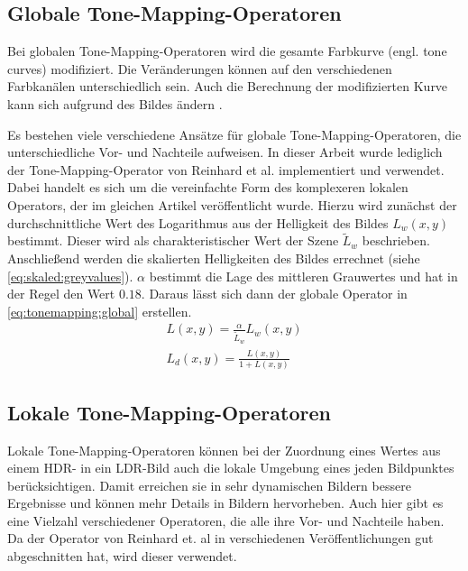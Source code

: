  \subsection{Globale \gls{Tone-Mapping}-Operatoren}
\label{sub:tone:global}
Bei globalen \gls{Tone-Mapping}-Operatoren wird die gesamte Farbkurve (engl. tone curves) modifiziert. Die Veränderungen können auf den verschiedenen Farbkanälen unterschiedlich sein. Auch die Berechnung der modifizierten Kurve kann sich aufgrund des Bildes ändern \cite[S. 146]{Bloch2012}. 

Es bestehen viele verschiedene Ansätze für globale \gls{Tone-Mapping}-Operatoren, die unterschiedliche Vor- und Nachteile aufweisen.
In dieser Arbeit wurde lediglich der \gls{Tone-Mapping}-Operator von Reinhard et al. \cite{ReinhardToneMapper} implementiert und verwendet. Dabei handelt es sich um die vereinfachte Form des komplexeren lokalen Operators, der im gleichen Artikel veröffentlicht wurde.
Hierzu wird zunächst der durchschnittliche Wert des Logarithmus aus der Helligkeit des Bildes $L_w(x,y)$ bestimmt. Dieser wird als charakteristischer Wert der Szene $\tilde{L}_w$ beschrieben. Anschließend werden die skalierten Helligkeiten des Bildes errechnet (siehe \autoref{eq:skaled:greyvalues}). $\alpha$ bestimmt die Lage des mittleren Grauwertes und hat in der Regel den Wert $0.18$. Daraus lässt sich dann der globale Operator in \autoref{eq:tonemapping:global} erstellen.
\begin{align}
\label{eq:skaled:greyvalues}
L(x,y) = \frac{\alpha}{\tilde{L}_w} L_w(x,y)\\
\label{eq:tonemapping:global}
L_d(x, y) =\frac{L(x,y)}{1+ L(x,y)}
\end{align}


\subsection{Lokale \gls{Tone-Mapping}-Operatoren}
\label{sub:tone:local}

Lokale \gls{Tone-Mapping}-Operatoren können bei der Zuordnung eines Wertes aus einem \gls{HDR}- in ein \gls{LDR}-Bild auch die lokale Umgebung eines jeden Bildpunktes berücksichtigen. Damit erreichen sie in sehr dynamischen Bildern bessere Ergebnisse und können mehr Details in Bildern hervorheben. Auch hier gibt es eine Vielzahl verschiedener Operatoren, die alle ihre Vor- und Nachteile haben. Da der Operator von Reinhard et. al \cite{ReinhardToneMapper} in verschiedenen Veröffentlichungen \cite{tone_mapper_1,tone_mapper_2} gut abgeschnitten hat, wird dieser verwendet.

